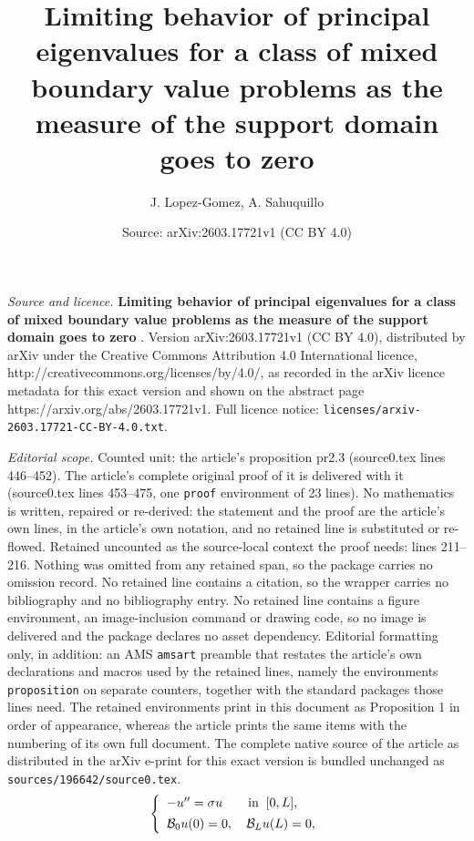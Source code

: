 \documentclass[10pt,a4paper]{amsart}
\title{\textbf{Limiting behavior of principal eigenvalues for a class of mixed boundary value problems as the measure of the support domain goes to zero }}
\author{J. Lopez-Gomez, A. Sahuquillo}
\date{Source: arXiv:2603.17721v1 (CC BY 4.0)}
\newcommand{\mc}{\mathcal}
\def\s{\sigma}
\begin{document}
\maketitle

\noindent\emph{Source and licence.} \textbf{Limiting behavior of principal eigenvalues for a class of mixed boundary value problems as the measure of the support domain goes to zero }. Version arXiv:2603.17721v1 (CC BY 4.0), distributed by arXiv under the Creative Commons Attribution 4.0 International licence, http://creativecommons.org/licenses/by/4.0/, as recorded in the arXiv licence metadata for this exact version and shown on the abstract page https://arxiv.org/abs/2603.17721v1. Full licence notice: \texttt{licenses/arxiv-2603.17721-CC-BY-4.0.txt}.\par\smallskip

\noindent\textit{Editorial scope.} Counted unit: the article's proposition pr2.3 (source0.tex lines 446--452). The article's complete original proof of it is delivered with it (source0.tex lines 453--475, one \texttt{proof} environment of 23 lines). No mathematics is written, repaired or re-derived: the statement and the proof are the article's own lines, in the article's own notation, and no retained line is substituted or re-flowed.  Retained uncounted as the source-local context the proof needs: lines 211--216.  Nothing was omitted from any retained span, so the package carries no omission record.  No retained line contains a citation, so the wrapper carries no bibliography and no bibliography entry.  No retained line contains a figure environment, an image-inclusion command or drawing code, so no image is delivered and the package declares no asset dependency.  Editorial formatting only, in addition: an AMS \texttt{amsart} preamble that restates the article's own declarations and macros used by the retained lines, namely the environments \texttt{proposition} on separate counters, together with the standard packages those lines need.  The retained environments print in this document as Proposition 1 in order of appearance, whereas the article prints the same items with the numbering of its own full document.  The complete native source of the article as distributed in the arXiv e-print for this exact version is bundled unchanged as \texttt{sources/196642/source0.tex}.
\begin{equation}
\label{1.3}
	\left \{ \begin{array}{ll}
		-u''=\s u \qquad  \hbox{in} \;\; [0,L],\\[1ex]
		\mc{B}_0 u(0) = 0, \quad \mc{B}_L u(L) = 0, \end{array} \right.
\end{equation}
\end{document}
